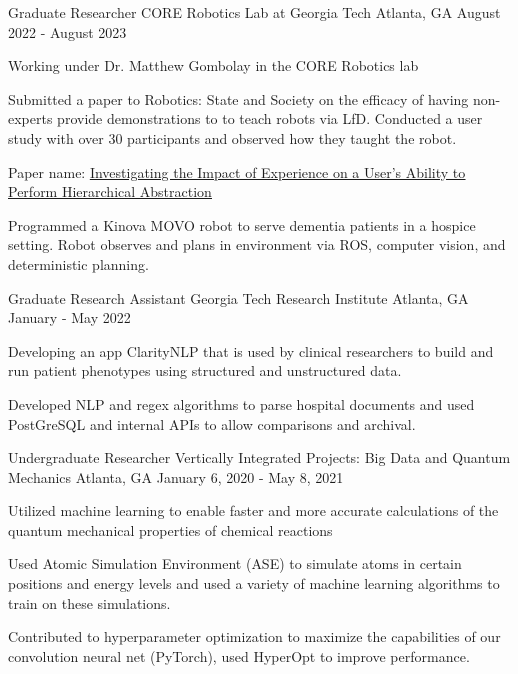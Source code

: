 
\begin{cventries}

\cventry
    {Graduate Researcher} %
    {CORE Robotics Lab at Georgia Tech} %
    {Atlanta, GA} %
    {August 2022 - August 2023} %
    {
      \begin{cvitems} %
        \item {Working under Dr. Matthew Gombolay in the CORE Robotics lab}
        \item {Submitted a paper to Robotics: State and Society on the efficacy of having non-experts provide demonstrations to to teach robots via LfD. Conducted a user study with over 30 participants and observed how they taught the robot.}
        \item Paper name: \textcolor{awesome}{\underline{\href{https://openreview.net/forum?id=kXy0HAnah0-}{Investigating the Impact of Experience on a User's Ability to Perform Hierarchical Abstraction}}}
        \item {Programmed a Kinova MOVO robot to serve dementia patients in a hospice setting. Robot observes and plans in environment via ROS, computer vision, and deterministic planning.}
      \end{cvitems}
    }
\cventry
    {Graduate Research Assistant} %
    {Georgia Tech Research Institute} %
    {Atlanta, GA} %
    {January - May 2022} %
    {
      \begin{cvitems} %
        \item {Developing an app ClarityNLP that is used by clinical researchers to build and run patient phenotypes using structured and unstructured data.}
        \item {Developed NLP and regex algorithms to parse hospital documents and used PostGreSQL and internal APIs to allow comparisons and archival.}
      \end{cvitems}
    }
\cventry
    {Undergraduate Researcher} %
    {Vertically Integrated Projects: Big Data and Quantum Mechanics} %
    {Atlanta, GA} %
    {January 6, 2020 - May 8, 2021} %
    {
      \begin{cvitems} %
        \item {Utilized machine learning to enable faster and more accurate calculations of the quantum mechanical properties of chemical reactions}
        \item {Used Atomic Simulation Environment (ASE) to simulate atoms in certain positions and energy levels and used a variety of machine learning algorithms to train on these simulations.}
        \item {Contributed to hyperparameter optimization to maximize the capabilities of our convolution neural net (PyTorch), used HyperOpt to improve performance.}
      \end{cvitems}
    }

\end{cventries}
